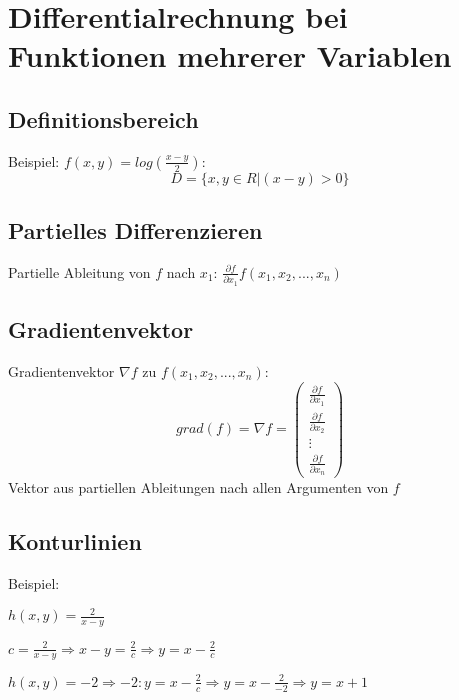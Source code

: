 \section{Differentialrechnung bei Funktionen mehrerer Variablen} %
\label{sec:differentialrechnung_bei_funktionen_mehrerer_variablen}

\subsection{Definitionsbereich} %
\label{sub:definitionsbereich}
Beispiel: $f(x,y)=log\left(\frac{x-y}{2}\right)$:
\[
  D=\{ x,y \in R|(x-y)>0\}
\]

\subsection{Partielles Differenzieren} %
\label{sub:partielles_differenzieren}

Partielle Ableitung von $f$ nach $x_1$: $\frac{\partial f}{\partial x_1} f(x_1,x_2,...,x_n)$

\subsection{Gradientenvektor} %
\label{sub:gradientenvektor}
Gradientenvektor $\nabla f$ zu $f(x_1,x_2,...,x_n)$: 
\begin{equation}
	grad(f) = \nabla f = \left(\begin{array}{c} \frac{\partial f}{\partial x_1} \\ 
	\frac{\partial f}{\partial x_2} \\ \vdots \\ \frac{\partial f}{\partial x_n} \end{array}\right)
\end{equation}
Vektor aus partiellen Ableitungen nach allen Argumenten von $f$

\subsection{Konturlinien} %
\label{sub:konturlinien}
Beispiel:

$h(x,y)=\frac{2}{x-y}$

$c=\frac{2}{x-y} \Rightarrow x-y=\frac{2}{c} \Rightarrow y=x-\frac{2}{c}$

$h(x,y)=-2 \Rightarrow -2:y=x-\frac{2}{c} \Rightarrow y=x-\frac{2}{-2} \Rightarrow y=x+1$

